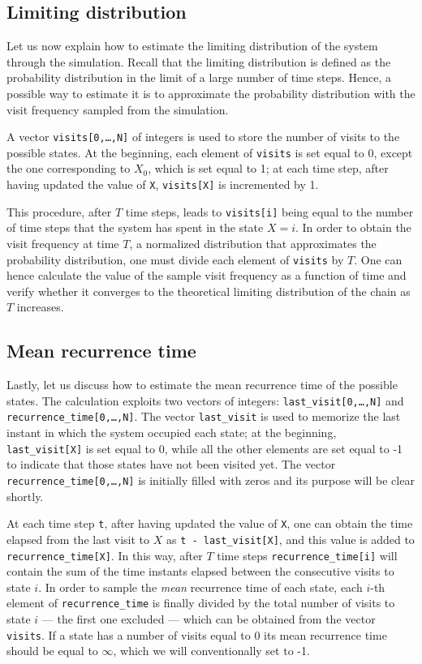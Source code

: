 \subsection{Limiting distribution}
Let us now explain how to estimate the limiting distribution of the system through the simulation. Recall that the limiting distribution is defined as the probability distribution in the limit of a large number of time steps. Hence, a possible way to estimate it is to approximate the probability distribution  with the visit frequency sampled from the simulation. 

A vector \texttt{visits[0,\dots,N]} of integers is used to store the number of visits to the possible states. At the beginning, each element of \texttt{visits} is set equal to 0, except the one corresponding to $X_0$, which is set equal to 1; at each time step, after having updated the value of \texttt{X}, \texttt{visits[X]} is incremented by 1. 

This procedure, after $T$ time steps, leads to \texttt{visits[i]} being equal to the number of time steps that the system has spent in the state $X = i$. In order to obtain the visit frequency at time $T$, \ie a normalized distribution that approximates the probability distribution, one must divide each element of \texttt{visits} by $T$. One can hence calculate the value of the sample visit frequency as a function of time and verify whether it converges to the theoretical limiting distribution of the chain as $T$ increases.

\subsection{Mean recurrence time}
Lastly, let us discuss how to estimate the mean recurrence time of the possible states. The calculation exploits two vectors of integers: \texttt{last\_visit[0,\dots,N]} and \texttt{recurrence\_time[0,\dots,N]}. The vector \texttt{last\_visit} is used to memorize the last instant in which the system occupied each state; at the beginning, \texttt{last\_visit[X]} is set equal to 0, while all the other elements are set equal to -1 to indicate that those states have not been visited yet. The vector \texttt{recurrence\_time[0,\dots,N]} is initially filled with zeros and its purpose will be clear shortly.

At each time step \texttt{t}, after having updated the value of \texttt{X}, one can obtain the time elapsed from the last visit to $X$ as \texttt{t - last\_visit[X]}, and this value is added to \texttt{recurrence\_time[X]}. In this way, after $T$ time steps \texttt{recurrence\_time[i]} will contain the sum of the time instants elapsed between the consecutive visits to state $i$. In order to sample the \emph{mean} recurrence time of each state, each $i$-th element of \texttt{recurrence\_time} is finally divided by the total number of visits to state $i$ --- the first one excluded --- which can be obtained from the vector \texttt{visits}. If a state has a number of visits equal to 0 its mean recurrence time should be equal to $\infty$, which we will conventionally set to -1. 

